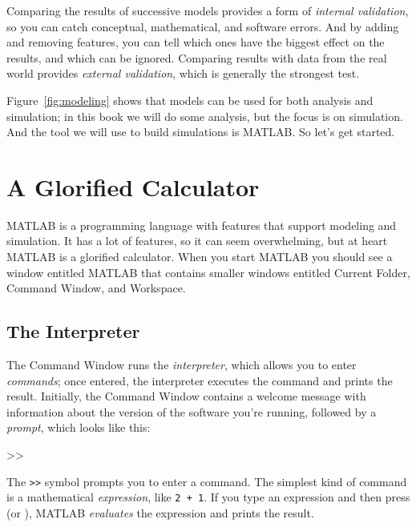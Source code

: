 
Comparing the results of successive models provides a form of \emph{internal  validation}, so you can catch conceptual, mathematical, and software errors.  And by adding and removing features, you can tell which ones have the biggest effect on the results, and which can be ignored.
%
%
%
%
Comparing results with data from the real world provides \emph{external validation}, which is generally the strongest test.

Figure~\ref{fig:modeling} shows that models can be used for both analysis and simulation; in this book we will do some analysis, but the focus is on simulation.  And the tool we will use to build simulations is MATLAB.  So let's get started.


\section{A Glorified Calculator}
\label{calc}

MATLAB is a programming language with features that support modeling and simulation.  It has a lot of features, so it can seem overwhelming, but at heart MATLAB is a glorified calculator.  When you start MATLAB you should see a window entitled MATLAB that contains smaller windows entitled Current Folder, Command Window, and Workspace.


\subsection{The Interpreter}
The Command Window runs the \emph{interpreter}, which allows you
to enter \emph{commands}; once entered, the interpreter executes the command and prints the
result.
Initially, the Command Window contains a welcome message with information
about the version of the software you're running, followed by a \emph{prompt}, which looks like this:

\begin{code}
>>
\end{code}

The \lstinline{>>} symbol prompts you to enter a command.
The simplest kind of command is a mathematical \emph{expression},
like \lstinline{2 + 1}.
If you type an expression and then press  (or ), MATLAB
\emph{evaluates} the expression and prints the result.

